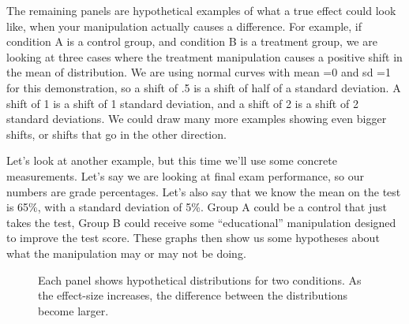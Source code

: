 \documentclass[
  letterpaper,
  DIV=11,
  numbers=noendperiod]{scrreprt}
\begin{document}
The remaining panels are hypothetical examples of what a true effect
could look like, when your manipulation actually causes a difference.
For example, if condition A is a control group, and condition B is a
treatment group, we are looking at three cases where the treatment
manipulation causes a positive shift in the mean of distribution. We are
using normal curves with mean =0 and sd =1 for this demonstration, so a
shift of .5 is a shift of half of a standard deviation. A shift of 1 is
a shift of 1 standard deviation, and a shift of 2 is a shift of 2
standard deviations. We could draw many more examples showing even
bigger shifts, or shifts that go in the other direction.

Let's look at another example, but this time we'll use some concrete
measurements. Let's say we are looking at final exam performance, so our
numbers are grade percentages. Let's also say that we know the mean on
the test is 65\%, with a standard deviation of 5\%. Group A could be a
control that just takes the test, Group B could receive some
``educational'' manipulation designed to improve the test score. These
graphs then show us some hypotheses about what the manipulation may or
may not be doing.

\begin{figure}


\caption{\label{fig-5.5effectdistsB}Each panel shows hypothetical
distributions for two conditions. As the effect-size increases, the
difference between the distributions become larger.}

\end{figure}%
\end{document}
